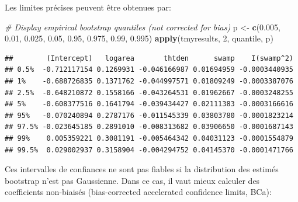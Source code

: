 \documentclass[
  12pt,
]{book}
\newenvironment{Shaded}{\begin{snugshade}}{\end{snugshade}}
\newcommand{\CommentTok}[1]{\textcolor[rgb]{0.56,0.35,0.01}{\textit{#1}}}
\newcommand{\DecValTok}[1]{\textcolor[rgb]{0.00,0.00,0.81}{#1}}
\newcommand{\FloatTok}[1]{\textcolor[rgb]{0.00,0.00,0.81}{#1}}
\newcommand{\KeywordTok}[1]{\textcolor[rgb]{0.13,0.29,0.53}{\textbf{#1}}}
\newcommand{\NormalTok}[1]{#1}
\newcommand{\StringTok}[1]{\textcolor[rgb]{0.31,0.60,0.02}{#1}}
\begin{document}
Les limites précises peuvent être obtenues par:

\begin{Shaded}
\begin{Highlighting}[]
\CommentTok{\# Display empirical bootstrap quantiles (not corrected for bias)}
\NormalTok{p \textless{}{-}}\StringTok{ }\KeywordTok{c}\NormalTok{(}\FloatTok{0.005}\NormalTok{, }\FloatTok{0.01}\NormalTok{, }\FloatTok{0.025}\NormalTok{, }\FloatTok{0.05}\NormalTok{, }\FloatTok{0.95}\NormalTok{, }\FloatTok{0.975}\NormalTok{, }\FloatTok{0.99}\NormalTok{, }\FloatTok{0.995}\NormalTok{)}
\KeywordTok{apply}\NormalTok{(tmyresults, }\DecValTok{2}\NormalTok{, quantile, p)}
\end{Highlighting}
\end{Shaded}

\begin{verbatim}
##        (Intercept)   logarea       thtden      swamp    I(swamp^2)
## 0.5%  -0.712117154 0.1269931 -0.046166987 0.01694959 -0.0003440935
## 1%    -0.688726835 0.1371762 -0.044997571 0.01809249 -0.0003387076
## 2.5%  -0.648210872 0.1558166 -0.043264531 0.01962667 -0.0003248255
## 5%    -0.608377516 0.1641794 -0.039434427 0.02111383 -0.0003166616
## 95%   -0.070240894 0.2787176 -0.011545339 0.03803780 -0.0001823214
## 97.5% -0.023645185 0.2891010 -0.008313682 0.03906650 -0.0001687143
## 99%    0.005359221 0.3081191 -0.005464342 0.04031123 -0.0001554879
## 99.5%  0.029002937 0.3158904 -0.004294752 0.04145370 -0.0001471766
\end{verbatim}

Ces intervalles de confiances ne sont pas fiables si la distribution des estimés bootstrap n'est pas Gaussienne. Dans ce cas, il vaut mieux calculer des coefficients non-biaisés (bias-corrected accelerated confidence limits, BCa):
\end{document}

